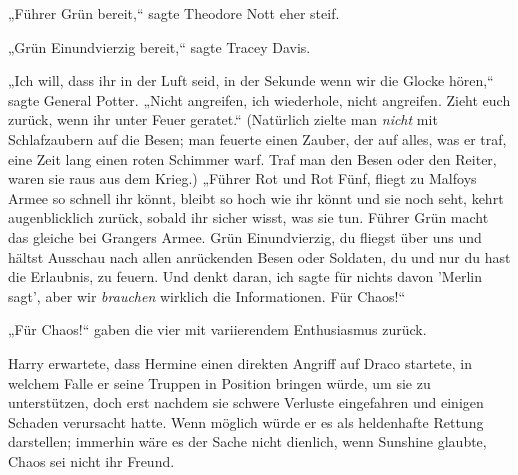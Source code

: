 „Führer Grün bereit,“ sagte Theodore Nott eher steif.

„Grün Einundvierzig bereit,“ sagte Tracey Davis.

„Ich will, dass ihr in der Luft seid, in der Sekunde wenn wir die Glocke hören,“ sagte General Potter. „Nicht angreifen, ich wiederhole, nicht angreifen. Zieht euch zurück, wenn ihr unter Feuer geratet.“ (Natürlich zielte man \emph{nicht} mit Schlafzaubern auf die Besen; man feuerte einen Zauber, der auf alles, was er traf, eine Zeit lang einen roten Schimmer warf. Traf man den Besen oder den Reiter, waren sie raus aus dem Krieg.) „Führer Rot und Rot Fünf, fliegt zu Malfoys Armee so schnell ihr könnt, bleibt so hoch wie ihr könnt und sie noch seht, kehrt augenblicklich zurück, sobald ihr sicher wisst, was sie tun. Führer Grün macht das gleiche bei Grangers Armee. Grün Einundvierzig, du fliegst über uns und hältst Ausschau nach allen anrückenden Besen oder Soldaten, du und nur du hast die Erlaubnis, zu feuern. Und denkt daran, ich sagte für nichts davon 'Merlin sagt', aber wir \emph{brauchen} wirklich die Informationen. Für Chaos!“

„Für Chaos!“ gaben die vier mit variierendem Enthusiasmus zurück.

Harry erwartete, dass Hermine einen direkten Angriff auf Draco startete, in welchem Falle er seine Truppen in Position bringen würde, um sie zu unterstützen, doch erst nachdem sie schwere Verluste eingefahren und einigen Schaden verursacht hatte. Wenn möglich würde er es als heldenhafte Rettung darstellen; immerhin wäre es der Sache nicht dienlich, wenn Sunshine glaubte, Chaos sei nicht ihr Freund.

